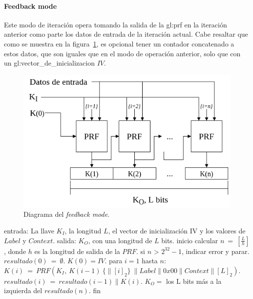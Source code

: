 \paragraph{Feedback mode}
Este modo de iteración opera tomando la salida de la \gls{gl:prf} en la
iteración anterior como parte los datos de entrada de la iteración actual.
Cabe resaltar que como se muestra en la figura~\ref{diagrama_feedback_mode},
es opcional tener un contador concatenado a estos datos, que son iguales que
en el modo de operación anterior, solo que con un
\gls{gl:vector_de_inicializacion} $IV$.

\begin{figure}
  \begin{center}
    \includegraphics[width=0.75\linewidth]{diagramas/feedback_mode}
    \caption{Diagrama del \textit{feedback mode}.}
    \label{diagrama_feedback_mode}
   \end{center}
\end{figure}

\begin{pseudocodigo}[caption={Funcionamiento del \textit{feedback mode}.},
label={mi:2}]
    entrada:   La llave $K_I$, la longitud $L$, el vector de inicialización IV
               y los valores de $Label$ y $Context$.
    salida:    $K_O$, con una longitud de $L$ bits.
    inicio
      calcular $n\: =\: [\frac{L}{h}]$, donde $h$ es la longitud de salida de la $PRF$.
      si $n$ > $2^{32}-1$, indicar error y parar.
      $resultado(0)\: =\: \emptyset$.
      $K(0) = IV$.
      para $i=1$ hasta $n$:
        $K(i)\: = \:PRF(K_I,\: K(i-1)\: \{\parallel {[i]}_2\}\: \parallel Label \parallel 0x00 \parallel Context \parallel {[L]}_2 )$.
        $resultado(i)\: =\: resultado(i-1) \parallel K(i)$.
      $K_O =$ los L bits más a la izquierda del $resultado(n)$.
    fin
\end{pseudocodigo}

